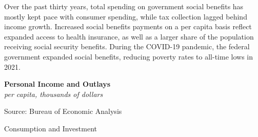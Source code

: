 \documentclass{report}
\makeatletter
\newcommand{\tbllink}[1]{\href{https://raw.githubusercontent.com/bdecon/US-chartbook/master/chartbook/data/#1}{\faTable}}
\newcommand*\short[1]{\expandafter\@gobbletwo\number\numexpr#1\relax}
\newcommand{\stdnode}[3]{\node[below, align=left, shift=({#1,#2})]{#3};}
\newcommand{\absnode}[3]{\node[below right, align=left] at (axis cs: #1,#2) {#3};}
\newcommand{\shdateaxisticks}{
		date coordinates in=x, axis line style={draw=none},
		xmax={2023-11-30},
		max space between ticks=40,	    
		xtick={{1990-01-01}, {1995-01-01}, {2000-01-01}, 
			{2005-01-01}, {2010-01-01}, {2015-01-01}, {2020-01-01}},
		minor xtick={},
		enlarge y limits={0.06}, enlarge x limits={0.01},
		xticklabel style={align=center, yshift=-2pt}, tick label style={inner sep=0pt},
		}
\newcommand{\bbar}[2]{extra #1 ticks = {{#2}}, extra #1 tick labels = ,
		extra #1 tick style = {grid=major, grid style={thick, black!25}},}
\newcommand{\stdline}[4]{\addplot[very thick, no markers, color=#1] 
		table [x=#2, y=#3, col sep=comma] {#4};	}
\newcommand{\rbars}{
		\fill[color=black!10] (axis cs:{1990-07-01},\pgfkeysvalueof{/pgfplots/ymin})
			rectangle (axis cs:{1991-03-01}, \pgfkeysvalueof{/pgfplots/ymax});
		\fill[color=black!10] (axis cs:{2007-12-01},\pgfkeysvalueof{/pgfplots/ymin})
			rectangle (axis cs:{2009-07-01}, \pgfkeysvalueof{/pgfplots/ymax});
		\fill[color=black!10] (axis cs:{2001-03-01},\pgfkeysvalueof{/pgfplots/ymin})
			rectangle (axis cs:{2001-11-01}, \pgfkeysvalueof{/pgfplots/ymax});
		\fill[color=black!10] (axis cs:{2020-02-01},\pgfkeysvalueof{/pgfplots/ymin})
			rectangle (axis cs:{2020-05-01}, \pgfkeysvalueof{/pgfplots/ymax});}
\makeatother
\begin{document}
{\begin{minipage}{0.76\textwidth}
Over the past thirty years, total spending on government social benefits has mostly kept pace with consumer spending, while tax collection lagged behind income growth. Increased social benefits payments on a per capita basis reflect expanded access to health insurance, as well as a larger share of the population receiving social security benefits. During the COVID-19 pandemic, the federal government expanded social benefits, reducing poverty rates to all-time lows in 2021. 
\end{minipage}
\vspace{1mm}

\begin{minipage}{0.38\textwidth}
\normalsize \textbf{Personal Income and Outlays}\\
\footnotesize{\textit{per capita, thousands of dollars}}
\vspace{3.5cm}

\hspace{2mm} 

\footnotesize{Source: Bureau of Economic Analysis} \hfill \tbllink{govpi.csv}
\end{minipage}\hspace{5mm}
\begin{minipage}{0.34\textwidth}
\small 
\end{minipage}
\vspace{3mm}

\begin{minipage}{0.76\textwidth}
\normalsize Consumption and Investment
\vspace{-1mm}


\end{minipage}}
\end{document}
